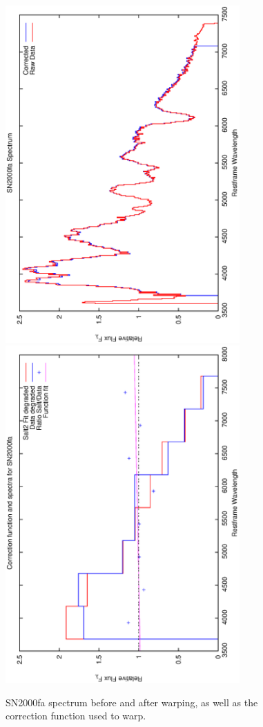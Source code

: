 \clearpage

\begin{figure}[p]
\centering
\includegraphics[angle=-90,width=0.8\textwidth]{./figures/spectrabeforeafter/SN2000fa_handpicked_v001_v023_before_after_spectra.ps}
\hfill
\includegraphics[angle=-90,width=0.8\textwidth]{./figures/corrections/SN2000fa_v001_correction.ps}
\hfill
\caption{SN2000fa spectrum before and after warping, as well as the correction function used to warp.}
\label{fig:SN2000fafour1}
\end{figure}

